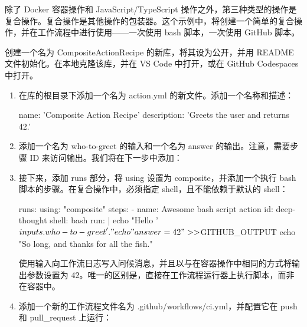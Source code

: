 
除了 Docker 容器操作和 JavaScript/TypeScript 操作之外，第三种类型的操作是复合操作。复合操作是其他操作的包装器。这个示例中，将创建一个简单的复合操作，并在工作流程中进行使用——一次使用 bash 脚本，一次使用 GitHub 脚本。


创建一个名为 CompositeActionRecipe 的新库，将其设为公开，并用 README 文件初始化。在本地克隆该库，并在 VS Code 中打开，或在 GitHub Codespaces 中打开。


\begin{enumerate}
\item 
在库的根目录下添加一个名为 action.yml 的新文件。添加一个名称和描述：

\begin{shell}
name: 'Composite Action Recipe'
description: 'Greets the user and returns 42.'
\end{shell}

\item 
添加一个名为 who-to-greet 的输入和一个名为 answer 的输出。注意，需要步骤 ID 来访问输出。我们将在下一步中添加：


\item 
接下来，添加 runs 部分，将 using 设置为 composite，并添加一个执行 bash 脚本的步骤。在复合操作中，必须指定 shell，且不能依赖于默认的 shell：

\begin{shell}
runs:
  using: "composite"
  steps:
    - name: Awesome bash script action
      id: deep-thought
      shell: bash
      run: |
        echo "Hello '${{ inputs.who-to-greet }}'."
        echo "answer=42" >> $GITHUB_OUTPUT
        echo "So long, and thanks for all the fish."
\end{shell}

使用输入向工作流日志写入问候消息，并且以与在容器操作中相同的方式将输出参数设置为 42。唯一的区别是，直接在工作流程运行器上执行脚本，而非在容器中。

\item 
添加一个新的工作流程文件名为 .github/workflows/ci.yml，并配置它在 push 和 pull\_request 上运行：


\end{enumerate}
